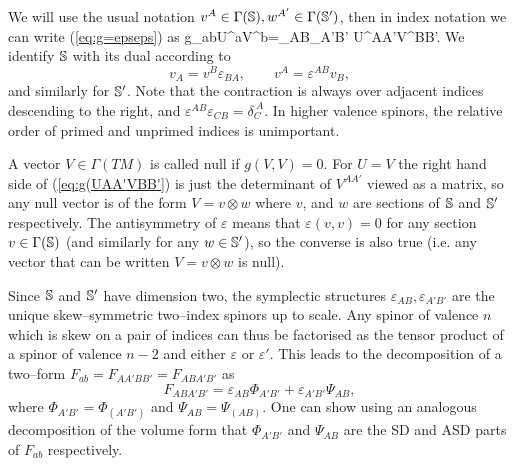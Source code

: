 We will use the usual notation $v^A\in\Gamma(\mathbb{S}),w^{A'}\in\Gamma(\mathbb{S}')$, then in index notation we can write (\ref{eq:g=epseps}) as
\be \label{eq:g(UAA'VBB'}
g_{ab}U^aV^b=\varepsilon_{AB}\varepsilon_{A'B'} U^{AA'}V^{BB'}.
\ee
We identify $\mathbb{S}$ with its dual according to
\[
v_A=v^B\varepsilon_{BA},\qquad v^A=\varepsilon^{AB}v_B,
\]
and similarly for $\mathbb{S}'$. Note that the contraction is always over adjacent indices descending to the right, and $\varepsilon^{AB}\varepsilon_{CB}=\delta_C^{\ A}$. In higher valence spinors, the relative order of primed and unprimed indices is unimportant.

A vector $V\in \Gamma(TM)$ is called null if $g(V, V)=0$. For $U=V$ the right hand side of (\ref{eq:g(UAA'VBB'}) is just the determinant of $V^{AA'} $ viewed as a matrix, so any null vector is of the form
$V=v \otimes w$ where $v$, and $w$ are sections of
$\mathbb{S}$ and $\mathbb{S}'$ respectively. The antisymmetry of $\varepsilon$ means that $\varepsilon(v,v)=0$ for any section $v\in\Gamma(\mathbb{S})$ (and similarly for any $w\in\mathbb{S}'$), so the converse is also true (i.e. any vector that can be written $V=v\otimes w$ is null).

Since $\mathbb{S}$ and $\mathbb{S}'$ have dimension two, the symplectic structures $\varepsilon_{AB},\varepsilon_{A'B'}$ are the unique skew--symmetric two--index spinors up to scale. Any spinor of valence $n$ which is skew on a pair of indices can thus be factorised as the tensor product of a spinor of valence $n-2$ and either $\varepsilon$ or $\varepsilon'$. This leads to the decomposition of a two--form $F_{ab}=F_{AA'BB'}=F_{ABA'B'}$ as
\[
F_{ABA'B'} = \varepsilon_{AB}\Phi_{A'B'} + \varepsilon_{A'B'}\Psi_{AB},
\]
where $\Phi_{A'B'}=\Phi_{(A'B')}$ and $\Psi_{AB}=\Psi_{(AB)}$. One can show using an analogous decomposition of the volume form that $\Phi_{A'B'}$ and $\Psi_{AB}$ are the SD and ASD parts of $F_{ab}$ respectively.


